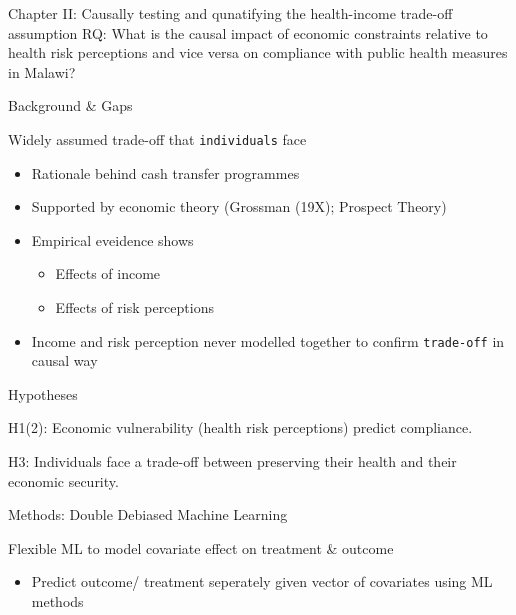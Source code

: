 \documentclass[
  ignorenonframetext,
]{beamer}
\providecommand{\tightlist}{%
  \setlength{\itemsep}{0pt}\setlength{\parskip}{0pt}}\usepackage{longtable,booktabs,array}
\begin{document}
\begin{frame}[fragile]{Chapter II: Causally testing and qunatifying the
health-income trade-off assumption}
\label{chapter-ii-causally-testing-and-qunatifying-the-health-income-trade-off-assumption}
RQ: What is the causal impact of economic constraints relative to health
risk perceptions and vice versa on compliance with public health
measures in Malawi?

\begin{block}{Background \& Gaps}
\label{background-gaps-1}
\begin{block}{Widely assumed trade-off that \texttt{individuals} face}
\label{widely-assumed-trade-off-that-individuals-face}
\begin{itemize}
\tightlist
\item
  Rationale behind cash transfer programmes
\item
  Supported by economic theory (Grossman (19X); Prospect Theory)
\item
  Empirical eveidence shows

  \begin{itemize}
  \tightlist
  \item
    Effects of income
  \item
    Effects of risk perceptions
  \end{itemize}
\item
  Income and risk perception never modelled together to confirm
  \texttt{trade-off} in causal way
\end{itemize}
\end{block}
\end{block}

\begin{block}{Hypotheses}
\label{hypotheses}
\begin{block}{H1(2): Economic vulnerability (health risk perceptions)
predict compliance.}
\label{h12-economic-vulnerability-health-risk-perceptions-predict-compliance.}
\end{block}

\begin{block}{H3: Individuals face a trade-off between preserving their
health and their economic security.}
\label{h3-individuals-face-a-trade-off-between-preserving-their-health-and-their-economic-security.}
\end{block}
\end{block}

\begin{block}{Methods: Double Debiased Machine Learning}
\label{methods-double-debiased-machine-learning}
\begin{block}{Flexible ML to model covariate effect on treatment \&
outcome}
\label{flexible-ml-to-model-covariate-effect-on-treatment-outcome}
\begin{itemize}
\tightlist
\item
  Predict outcome/ treatment seperately given vector of covariates using
  ML methods
\end{itemize}
\end{block}


\end{block}
\end{frame}
\end{document}
